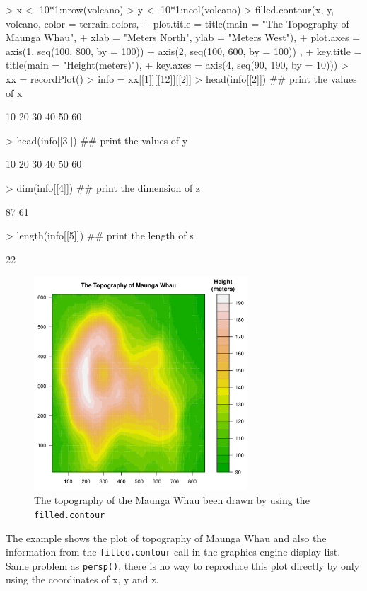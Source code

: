 \documentclass[paper=a4, fontsize=11pt]{report}
\begin{document}
\begin{Schunk}
\begin{Sinput}
> x <- 10*1:nrow(volcano)
> y <- 10*1:ncol(volcano)
> filled.contour(x, y, volcano, color = terrain.colors,
+     plot.title = title(main = "The Topography of Maunga Whau",
+     xlab = "Meters North", ylab = "Meters West"),
+     plot.axes = { axis(1, seq(100, 800, by = 100))
+                   axis(2, seq(100, 600, by = 100)) },
+     key.title = title(main = "Height\n(meters)"),
+     key.axes = axis(4, seq(90, 190, by = 10)))
> xx = recordPlot()
> info = xx[[1]][[12]][[2]]
> head(info[[2]])  ## print the values of x
\end{Sinput}
\begin{Soutput}
[1] 10 20 30 40 50 60
\end{Soutput}
\begin{Sinput}
> head(info[[3]])  ## print the values of y
\end{Sinput}
\begin{Soutput}
[1] 10 20 30 40 50 60
\end{Soutput}
\begin{Sinput}
> dim(info[[4]])  ## print the dimension of z
\end{Sinput}
\begin{Soutput}
[1] 87 61
\end{Soutput}
\begin{Sinput}
> length(info[[5]])  ## print the length of s
\end{Sinput}
\begin{Soutput}
[1] 22
\end{Soutput}
\end{Schunk}


\begin{figure}[h]
\begin{center}
  \includegraphics[height = 8cm, width = 8cm]{figure/filled_example_1.pdf}
  \caption{The topography of the Maunga Whau been drawn by using the \texttt{filled.contour}}
  	\label{figure8}
\end{center}
\end{figure}
The example shows the plot of topography of Maunga Whau and also the information from the \texttt{filled.contour} call in the graphics engine display list. Same problem as \texttt{persp()}, there is no way to reproduce this plot directly by only using the coordinates of x, y and z.\\
\end{document}
